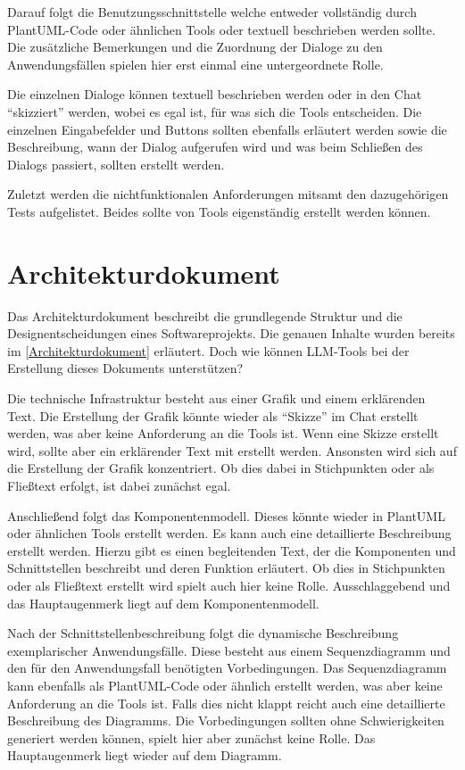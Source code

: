Darauf folgt die Benutzungsschnittstelle welche entweder vollständig durch PlantUML-Code oder ähnlichen Tools 
oder textuell beschrieben werden sollte. Die zusätzliche Bemerkungen und die Zuordnung der Dialoge zu den Anwendungsfällen 
spielen hier erst einmal eine untergeordnete Rolle.

Die einzelnen Dialoge können textuell beschrieben werden oder in den Chat ``skizziert'' werden, wobei es egal ist, 
für was sich die Tools entscheiden. Die einzelnen Eingabefelder und Buttons sollten ebenfalls erläutert werden sowie 
die Beschreibung, wann der Dialog aufgerufen wird und was beim Schließen des Dialogs passiert, sollten erstellt werden.

Zuletzt werden die nichtfunktionalen Anforderungen mitsamt den dazugehörigen Tests aufgelistet. Beides sollte 
von Tools eigenständig erstellt werden können.

\section{Architekturdokument}  \label{LLMArchitekturdokument}

Das Architekturdokument beschreibt die grundlegende Struktur und die Designentscheidungen eines Softwareprojekts. 
Die genauen Inhalte wurden bereits im \autoref{Architekturdokument} erläutert. Doch wie können LLM-Tools bei der 
Erstellung dieses Dokuments unterstützen?

Die technische Infrastruktur besteht aus einer Grafik und einem erklärenden Text. Die Erstellung der Grafik 
könnte wieder als ``Skizze'' im Chat erstellt werden, was aber keine Anforderung an die Tools ist. Wenn 
eine Skizze erstellt wird, sollte aber ein erklärender Text mit erstellt werden. Ansonsten wird sich auf 
die Erstellung der Grafik konzentriert. Ob dies dabei in Stichpunkten oder als Fließtext erfolgt, ist dabei 
zunächst egal.

Anschließend folgt das Komponentenmodell. Dieses könnte wieder in PlantUML oder ähnlichen Tools erstellt 
werden. Es kann auch eine detaillierte Beschreibung erstellt werden. Hierzu gibt es einen begleitenden Text, der die 
Komponenten und Schnittstellen beschreibt und deren Funktion erläutert. Ob dies in Stichpunkten oder als 
Fließtext erstellt wird spielt auch hier keine Rolle. Ausschlaggebend und das Hauptaugenmerk liegt auf dem 
Komponentenmodell.

Nach der Schnittstellenbeschreibung folgt die dynamische Beschreibung exemplarischer Anwendungsfälle. Diese besteht 
aus einem Sequenzdiagramm und den für den Anwendungsfall benötigten Vorbedingungen. Das Sequenzdiagramm kann ebenfalls 
als PlantUML-Code oder ähnlich erstellt werden, was aber keine Anforderung an die Tools ist. Falls dies nicht klappt 
reicht auch eine detaillierte Beschreibung des Diagramms. Die Vorbedingungen sollten ohne Schwierigkeiten 
generiert werden können, spielt hier aber zunächst keine Rolle. Das Hauptaugenmerk liegt wieder auf dem Diagramm.

